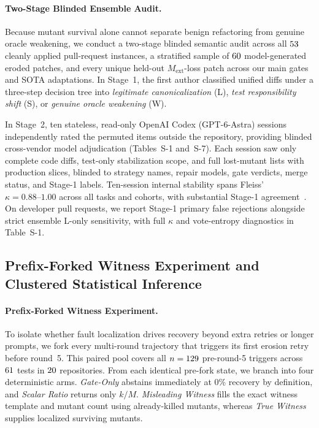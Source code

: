 \paragraph{Two-Stage Blinded Ensemble Audit.}
Because mutant survival alone cannot separate benign refactoring from genuine oracle weakening, we conduct a two-stage blinded semantic audit across all $53$ cleanly applied pull-request instances, a stratified sample of $60$ model-generated eroded patches, and every unique held-out $M_{\text{ext}}$-loss patch across our main gates and SOTA adaptations. In Stage~1, the first author classified unified diffs under a three-step decision tree into \emph{legitimate canonicalization} (L), \emph{test responsibility shift} (S), or \emph{genuine oracle weakening} (W).

In Stage~2, ten stateless, read-only OpenAI Codex (GPT-6-Astra) sessions independently rated the permuted items outside the repository, providing blinded cross-vendor model adjudication (Tables~S-1 and~S-7). Each session saw only complete code diffs, test-only stabilization scope, and full lost-mutant lists with production slices, blinded to strategy names, repair models, gate verdicts, merge status, and Stage-1 labels. Ten-session internal stability spans Fleiss' $\kappa = 0.88\text{--}1.00$ across all tasks and cohorts, with substantial Stage-1 agreement~\cite{cohen1960kappa}. On developer pull requests, we report Stage-1 primary false rejections alongside strict ensemble L-only sensitivity, with full $\kappa$ and vote-entropy diagnostics in Table~S-1.

\subsection{Prefix-Forked Witness Experiment and Clustered Statistical Inference}

\paragraph{Prefix-Forked Witness Experiment.}
To isolate whether fault localization drives recovery beyond extra retries or longer prompts, we fork every multi-round trajectory that triggers its first erosion retry before round~5. This paired pool covers all $n = 129$ pre-round-5 triggers across $61$ tests in $20$ repositories. From each identical pre-fork state, we branch into four deterministic arms. \emph{Gate-Only} abstains immediately at 0\% recovery by definition, and \emph{Scalar Ratio} returns only $k/M$. \emph{Misleading Witness} fills the exact witness template and mutant count using already-killed mutants, whereas \emph{True Witness} supplies localized surviving mutants.

